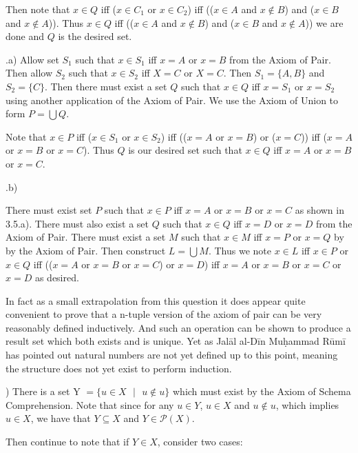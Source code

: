\documentclass{article}
\begin{document}
\medskip
Then note that $x \in Q$ iff ($x \in C_1$ or $x \in C_2$) iff (($x \in A$ and $x \notin B$) and ($x \in B$ and $x \notin A$)). Thus $x \in Q$ iff  (($x \in A$ and $x \notin B$) and ($x \in B$ and $x \notin A$)) we are done and $Q$ is the desired set.

.a)
Allow set $S_1$ such that $x \in S_1$ iff $x = A$ or $x = B$ from the Axiom of Pair. Then allow $S_2$ such that $x \in S_2$ iff $X = C$ or $X = C$. Then $S_1 = \{A,B\}$ and $S_2 = \{C\}$. Then there must exist a set $Q$ such that $x \in Q$ iff $x = S_1$ or $x = S_2$ using another application of the Axiom of Pair. We use the Axiom of Union to form $P = \bigcup Q$.

\medskip
Note that $x \in P$ iff ($x \in S_1$ or $x \in S_2$) iff (($x = A$ or $x = B$) or ($x = C$)) iff ($x = A$ or $x = B$ or $x = C$). Thus $Q$ is our desired set such that $x \in Q$ iff $x = A$ or $x = B$ or $x = C$.

.b)

There must exist set $P$ such that $x \in P$ iff $x = A$ or $x = B$ or $x = C$ as shown in 3.5.a). There must also exist a set $Q$ such that $x \in Q$ iff $x = D$ or $x = D$ from the Axiom of Pair. There must exist a set $M$ such that $x \in M$ iff $x = P$ or $x = Q$ by by the Axiom of Pair. Then construct $L = \bigcup M$. Thus we note $x \in L$ iff $x \in P$ or $x \in Q$ iff (($x = A$ or $x = B$ or $x = C$) or $x = D$) iff $x = A$ or $x = B$ or $x = C$ or $x = D$ as desired.

\medskip

In fact as a small extrapolation from this question it does appear quite convenient to prove that a n-tuple version of the axiom of pair can be very reasonably defined inductively. And such an operation can be shown to produce a result set which both exists and is unique. Yet as Jalāl al-Dīn Muḥammad Rūmī has pointed out natural numbers are not yet defined up to this point, meaning the structure does not yet exist to perform induction.

)
There is a set Y $= \{u \in X \text{ } | \text{ } u \notin u\}$ which must exist by the Axiom of Schema Comprehension. Note that since for any $u \in Y$, $u \in X$ and $u \notin u$, which implies $u \in X$, we have that $Y \subseteq X$ and $Y \in \mathcal{P}(X)$.

\medskip

Then continue to note that if $Y \in X$, consider two cases:

\medskip
\end{document}
